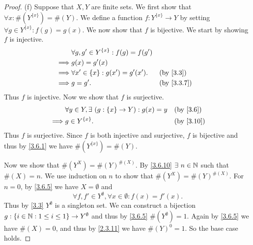 \begin{proof}{(f)}
  Suppose that \(X, Y\) are finite sets.
  We first show that \(\forall x : \#(Y^{\{x\}}) = \#(Y)\).
  We define a function \(f : Y^{\{x\}} \to Y\) by setting \(\forall g \in Y^{\{x\}} : f(g) = g(x)\).
  We now show that \(f\) is bijective.
  We start by showing \(f\) is injective.
  \begin{align*}
             & \forall g, g' \in Y^{\{x\}} : f(g) = f(g')                               \\
    \implies & g(x) = g'(x)                                                             \\
    \implies & \forall x' \in \{x\} : g(x') = g'(x').     &  & \text{(by \cref{3.3})}   \\
    \implies & g = g'.                                    &  & \text{(by \cref{3.3.7})}
  \end{align*}
  Thus \(f\) is injective.
  Now we show that \(f\) is surjective.
  \begin{align*}
             & \forall y \in Y, \exists\ (g : \{x\} \to Y) : g(x) = y &  & \text{(by \cref{3.6})}  \\
    \implies & g \in Y^{\{x\}}.                                       &  & \text{(by \cref{3.10})}
  \end{align*}
  Thus \(f\) is surjective.
  Since \(f\) is both injective and surjective, \(f\) is bijective and thus by \cref{3.6.1} we have \(\#(Y^{\{x\}}) = \#(Y)\).

  Now we show that \(\#(Y^X) = \#(Y)^{\#(X)}\).
  By \cref{3.6.10} \(\exists\ n \in \N\) such that \(\#(X) = n\).
  We use induction on \(n\) to show that \(\#(Y^X) = \#(Y)^{\#(X)}\).
  For \(n = 0\), by \cref{3.6.5} we have \(X = \emptyset\) and
  \[
    \forall f, f' \in Y^\emptyset, \forall x \in \emptyset : f(x) = f'(x).
  \]
  Thus by \cref{3.3} \(Y^\emptyset\) is a singleton set.
  We can construct a bijection \(g : \{i \in \mathbb{N} : 1 \leq i \leq 1\} \to Y^\emptyset\) and thus by \cref{3.6.5} \(\#(Y^\emptyset) = 1\).
  Again by \cref{3.6.5} we have \(\#(X) = 0\), and thus by \cref{2.3.11} we have \(\#(Y)^0 = 1\).
  So the base case holds.


\end{proof}
